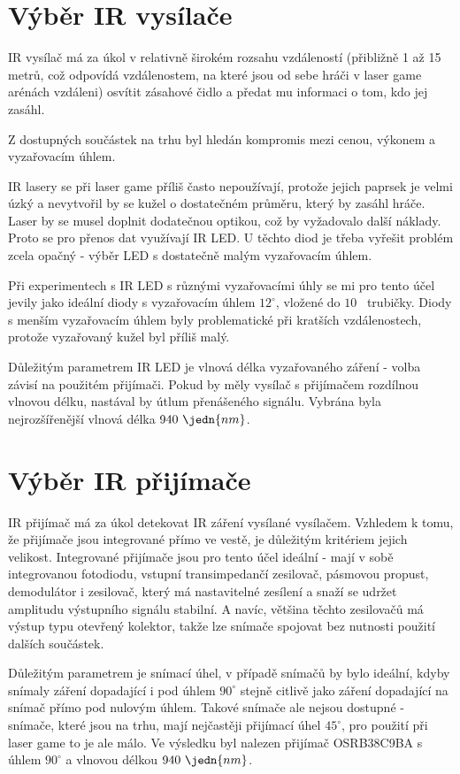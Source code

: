 \section{Výběr IR vysílače}
IR vysílač má za úkol v relativně širokém rozsahu vzdáleností (přibližně 1 až 15 metrů, což odpovídá vzdálenostem, na které jsou od sebe hráči v laser game arénách vzdáleni) osvítit zásahové čidlo a předat mu informaci o tom, kdo jej zasáhl.

Z dostupných součástek na trhu byl hledán kompromis mezi cenou, výkonem a vyzařovacím úhlem.

IR lasery se při laser game příliš často nepoužívají, protože jejich paprsek je velmi úzký a nevytvořil by se kužel o dostatečném průměru, který by zasáhl hráče. Laser by se musel doplnit dodatečnou optikou, což by vyžadovalo další náklady. Proto se pro přenos dat využívají IR LED. U těchto diod je třeba vyřešit problém zcela opačný - výběr LED s dostatečně malým vyzařovacím úhlem.

Při experimentech s IR LED s různými vyzařovacími úhly se mi pro tento účel jevily jako ideální diody s vyzařovacím úhlem $12^\circ$, vložené do $10$~ trubičky. Diody s menším vyzařovacím úhlem byly problematické při kratších vzdálenostech, protože vyzařovaný kužel byl příliš malý.

Důležitým parametrem IR LED je vlnová délka vyzařovaného záření - volba závisí na použitém přijímači. Pokud by měly vysílač s přijímačem rozdílnou vlnovou délku, nastával by útlum přenášeného signálu. Vybrána byla nejrozšířenější vlnová délka $940~\jedn{nm}$.

\section{Výběr IR přijímače}
IR přijímač má za úkol detekovat IR záření vysílané vysílačem. Vzhledem k tomu, že přijímače jsou integrované přímo ve vestě, je důležitým kritériem jejich velikost. Integrované přijímače jsou pro tento účel ideální - mají v sobě integrovanou fotodiodu, vstupní transimpedančí zesilovač, pásmovou propust, demodulátor i zesilovač, který má nastavitelné zesílení a snaží se udržet amplitudu výstupního signálu stabilní. A navíc, většina těchto zesilovačů má výstup typu otevřený kolektor, takže lze snímače spojovat bez nutnosti použití dalších součástek.

Důležitým parametrem je snímací úhel, v případě snímačů by bylo ideální, kdyby snímaly záření dopadající i pod úhlem $90^\circ$ stejně citlivě jako záření dopadající na snímač přímo pod nulovým úhlem. Takové snímače ale nejsou dostupné - snímače, které jsou na trhu, mají nejčastěji přijímací úhel $45^\circ$, pro použití při laser game to je ale málo. Ve výsledku byl nalezen přijímač OSRB38C9BA s úhlem $90^\circ$ a vlnovou délkou $940~\jedn{nm}$.

